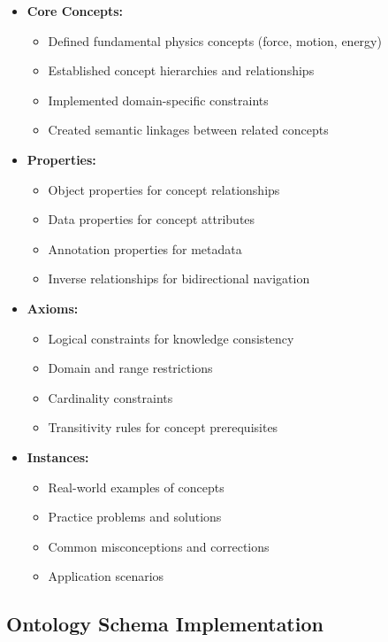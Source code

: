 \begin{itemize}
  \item \textbf{Core Concepts:} 
    \begin{itemize}
      \item Defined fundamental physics concepts (force, motion, energy)
      \item Established concept hierarchies and relationships
      \item Implemented domain-specific constraints
      \item Created semantic linkages between related concepts
    \end{itemize}
  
  \item \textbf{Properties:} 
    \begin{itemize}
      \item Object properties for concept relationships
      \item Data properties for concept attributes
      \item Annotation properties for metadata
      \item Inverse relationships for bidirectional navigation
    \end{itemize}
  
  \item \textbf{Axioms:} 
    \begin{itemize}
      \item Logical constraints for knowledge consistency
      \item Domain and range restrictions
      \item Cardinality constraints
      \item Transitivity rules for concept prerequisites
    \end{itemize}
  
  \item \textbf{Instances:} 
    \begin{itemize}
      \item Real-world examples of concepts
      \item Practice problems and solutions
      \item Common misconceptions and corrections
      \item Application scenarios
    \end{itemize}

\end{itemize}

\subsection{Ontology Schema Implementation}
\label{subsec:ontology-schema}

